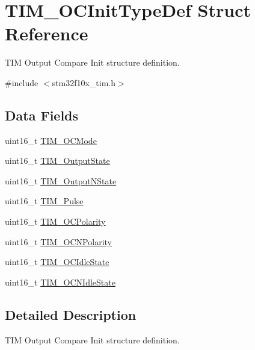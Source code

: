 \hypertarget{struct_t_i_m___o_c_init_type_def}{}\section{T\+I\+M\+\_\+\+O\+C\+Init\+Type\+Def Struct Reference}
\label{struct_t_i_m___o_c_init_type_def}


T\+IM Output Compare Init structure definition.  




{\ttfamily \#include $<$stm32f10x\+\_\+tim.\+h$>$}

\subsection*{Data Fields}
\begin{DoxyCompactItemize}
\item 
uint16\+\_\+t \mbox{\hyperlink{struct_t_i_m___o_c_init_type_def_afa69e616eb0b11bd238062dd8a5ceaa5}{T\+I\+M\+\_\+\+O\+C\+Mode}}
\item 
uint16\+\_\+t \mbox{\hyperlink{struct_t_i_m___o_c_init_type_def_a1e88e3081574da1e1abc089df87985ba}{T\+I\+M\+\_\+\+Output\+State}}
\item 
uint16\+\_\+t \mbox{\hyperlink{struct_t_i_m___o_c_init_type_def_a74a30f1a994c6676c0ce2b56243ed184}{T\+I\+M\+\_\+\+Output\+N\+State}}
\item 
uint16\+\_\+t \mbox{\hyperlink{struct_t_i_m___o_c_init_type_def_a3f43bd9158c651d6d9fa2720ad75ab01}{T\+I\+M\+\_\+\+Pulse}}
\item 
uint16\+\_\+t \mbox{\hyperlink{struct_t_i_m___o_c_init_type_def_acc7066b59671f62f2696c382c879c9c8}{T\+I\+M\+\_\+\+O\+C\+Polarity}}
\item 
uint16\+\_\+t \mbox{\hyperlink{struct_t_i_m___o_c_init_type_def_aa392739b843a7974702c5ec71864f982}{T\+I\+M\+\_\+\+O\+C\+N\+Polarity}}
\item 
uint16\+\_\+t \mbox{\hyperlink{struct_t_i_m___o_c_init_type_def_afb328e9ef4de6eb9d78390d7366b9a6e}{T\+I\+M\+\_\+\+O\+C\+Idle\+State}}
\item 
uint16\+\_\+t \mbox{\hyperlink{struct_t_i_m___o_c_init_type_def_a68f0241aa8d57bb42cd8e56c153f8e48}{T\+I\+M\+\_\+\+O\+C\+N\+Idle\+State}}
\end{DoxyCompactItemize}


\subsection{Detailed Description}
T\+IM Output Compare Init structure definition. 



